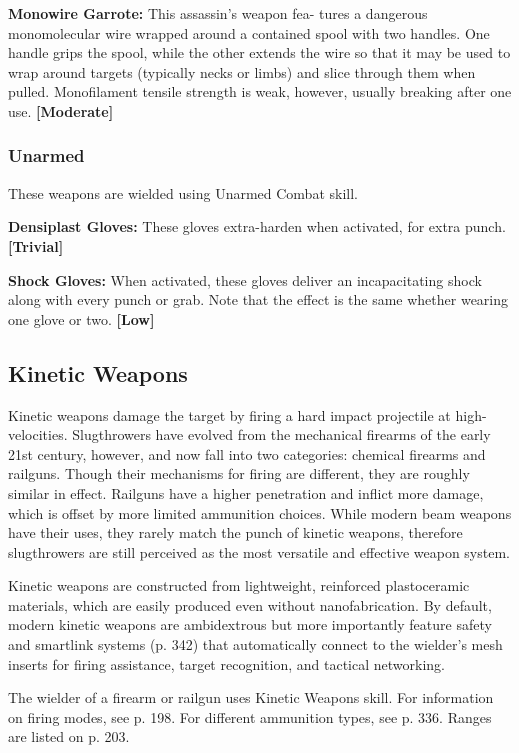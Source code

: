 \textbf{Monowire Garrote:} This assassin's weapon fea-
tures a dangerous monomolecular wire wrapped 
around a contained spool with two handles. One 
handle grips the spool, while the other extends the 
wire so that it may be used to wrap around targets 
(typically necks or limbs) and slice through them 
when pulled. Monofilament tensile strength is weak, 
however, usually breaking after one use. \textbf{[Moderate]}

\subsubsection{Unarmed}

These weapons are wielded using Unarmed Combat skill.

\textbf{Densiplast Gloves:} These gloves extra-harden when 
activated, for extra punch. \textbf{[Trivial]}

\textbf{Shock Gloves:} When activated, these gloves deliver 
an incapacitating shock along with every punch or 
grab. Note that the effect is the same whether wearing 
one glove or two. \textbf{[Low]}

\subsection{Kinetic Weapons}

Kinetic weapons damage the target by firing a hard 
impact projectile at high-velocities. Slugthrowers 
have evolved from the mechanical firearms of the 
early 21st century, however, and now fall into two 
categories: chemical firearms and railguns. Though 
their mechanisms for firing are different, they are 
roughly similar in effect. Railguns have a higher 
penetration and inflict more damage, which is offset 
by more limited ammunition choices. While modern 
beam weapons have their uses, they rarely match the 
punch of kinetic weapons, therefore slugthrowers 
are still perceived as the most versatile and effective 
weapon system.

Kinetic weapons are constructed from lightweight, 
reinforced plastoceramic materials, which are easily 
produced even without nanofabrication. By default, 
modern kinetic weapons are ambidextrous but more 
importantly feature safety and smartlink systems (p. 
342) that automatically connect to the wielder's mesh 
inserts for firing assistance, target recognition, and 
tactical networking.

The wielder of a firearm or railgun uses Kinetic 
Weapons skill. For information on firing modes, see 
p. 198. For different ammunition types, see p. 336. 
Ranges are listed on p. 203.

